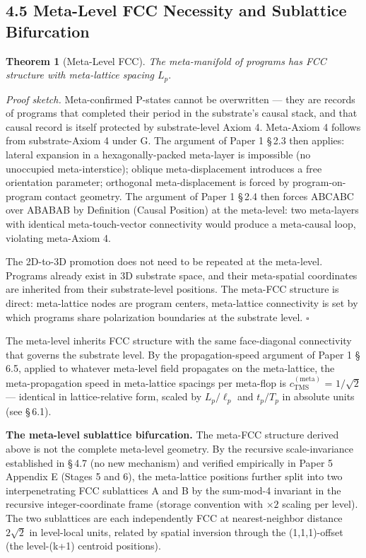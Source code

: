 \documentclass[11pt,oneside]{report}
\newtheorem{theorem}{Theorem}[section]
\theoremstyle{definition}
\theoremstyle{remark}
\begin{document}
\subsection*{4.5 Meta-Level FCC Necessity and Sublattice Bifurcation}

\begin{theorem}[Meta-Level FCC]
The meta-manifold of programs
has FCC structure with meta-lattice spacing \ensuremath{L_{p}.}
\end{theorem}

\emph{Proof sketch.} Meta-confirmed P-states cannot be overwritten ---
they are records of programs that completed their period in the
substrate's causal stack, and that causal record is itself protected by
substrate-level Axiom 4. Meta-Axiom 4 follows from substrate-Axiom 4
under G. The argument of Paper 1 \S\,2.3 then applies: lateral expansion in
a hexagonally-packed meta-layer is impossible (no unoccupied
meta-interstice); oblique meta-displacement introduces a free
orientation parameter; orthogonal meta-displacement is forced by
program-on-program contact geometry. The argument of Paper 1 \S\,2.4 then
forces ABCABC over ABABAB by Definition (Causal Position) at the
meta-level: two meta-layers with identical meta-touch-vector
connectivity would produce a meta-causal loop, violating meta-Axiom 4.

The 2D-to-3D promotion does not need to be repeated at the meta-level.
Programs already exist in 3D substrate space, and their meta-spatial
coordinates are inherited from their substrate-level positions. The
meta-FCC structure is direct: meta-lattice nodes are program centers,
meta-lattice connectivity is set by which programs share polarization
boundaries at the substrate level. \hfill\ensuremath{\square}

The meta-level inherits FCC structure with the same face-diagonal
connectivity that governs the substrate level. By the propagation-speed
argument of Paper 1 \S\,6.5, applied to whatever meta-level field
propagates on the meta-lattice, the meta-propagation speed in
meta-lattice spacings per meta-flop is \ensuremath{c_{\mathrm{TMS}}^{(\text{meta})}} = \ensuremath{1/\sqrt{2}} ---
identical in lattice-relative form, scaled by \ensuremath{L_{p}/\ell_{p}} and \ensuremath{t_{p}/T_{p}} in
absolute units (see \S\,6.1).

\textbf{The meta-level sublattice bifurcation.} The meta-FCC structure
derived above is not the complete meta-level geometry. By the recursive
scale-invariance established in \S\,4.7 (no new mechanism) and verified
empirically in Paper 5 Appendix E (Stages 5 and 6), the meta-lattice
positions further split into two interpenetrating FCC sublattices A and
B by the sum-mod-4 invariant in the recursive integer-coordinate frame
(storage convention with \ensuremath{\times 2} scaling per level). The two sublattices are
each independently FCC at nearest-neighbor distance \ensuremath{2\sqrt{2}} in level-local
units, related by spatial inversion through the (1,1,1)-offset (the
level-(k+1) centroid positions).
\end{document}
